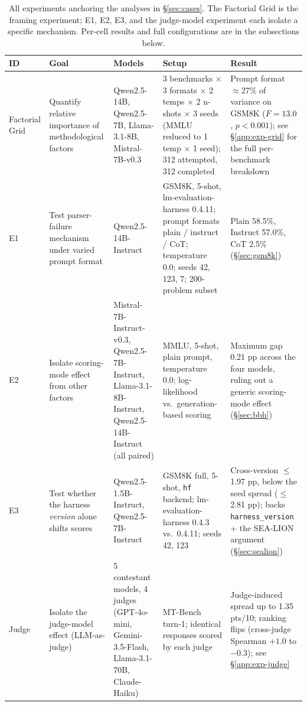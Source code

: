 \documentclass[11pt]{article}
\begin{document}
\begin{table}[ht]
\centering
\footnotesize
\setlength{\tabcolsep}{3pt}
\begin{tabular}{lp{3.2cm}p{2.6cm}p{4.0cm}p{3.4cm}}
\toprule
\textbf{ID} & \textbf{Goal} & \textbf{Models} & \textbf{Setup} & \textbf{Result} \\
\midrule
Factorial Grid &
Quantify relative importance of methodological factors &
Qwen2.5-14B, Qwen2.5-7B, Llama-3.1-8B, Mistral-7B-v0.3 &
3 benchmarks $\times$ 3 formats $\times$ 2 temps $\times$ 2 n-shots $\times$ 3 seeds (MMLU reduced to 1 temp $\times$ 1 seed); 312 attempted, 312 completed &
Prompt format $\approx$27\% of variance on GSM8K ($F{=}13.0$, $p{<}0.001$); see \S\ref{app:exp-grid} for the full per-benchmark breakdown \\
\midrule
E1 &
Test parser-failure mechanism under varied prompt format &
Qwen2.5-14B-Instruct &
GSM8K, 5-shot, lm-evaluation-harness 0.4.11; prompt formats plain / instruct / CoT; temperature 0.0; seeds 42, 123, 7; 200-problem subset &
Plain 58.5\%, Instruct 57.0\%, CoT 2.5\% (\S\ref{sec:gsm8k}) \\
\midrule
E2 &
Isolate scoring-mode effect from other factors &
Mistral-7B-Instruct-v0.3, Qwen2.5-7B-Instruct, Llama-3.1-8B-Instruct, Qwen2.5-14B-Instruct (all paired) &
MMLU, 5-shot, plain prompt, temperature 0.0; log-likelihood vs.\ generation-based scoring &
Maximum gap 0.21 pp across the four models, ruling out a generic scoring-mode effect (\S\ref{sec:bbh}) \\
\midrule
E3 &
Test whether the harness \emph{version} alone shifts scores &
Qwen2.5-1.5B-Instruct, Qwen2.5-7B-Instruct &
GSM8K full, 5-shot, \texttt{hf} backend; lm-evaluation-harness 0.4.3 vs.\ 0.4.11; seeds 42, 123 &
Cross-version $\le$1.97 pp, below the seed spread ($\le$2.81 pp); backs \texttt{harness\_version} + the SEA-LION argument (\S\ref{sec:sealion}) \\
\midrule
Judge &
Isolate the judge-model effect (LLM-as-judge) &
5 contestant models, 4 judges (GPT-4o-mini, Gemini-3.5-Flash, Llama-3.1-70B, Claude-Haiku) &
MT-Bench turn-1; identical responses scored by each judge &
Judge-induced spread up to 1.35 pts/10; ranking flips (cross-judge Spearman $+1.0$ to $-0.3$); see \S\ref{app:exp-judge} \\
\bottomrule
\end{tabular}
\caption{All experiments anchoring the analyses in \S\ref{sec:cases}. The
Factorial Grid is the framing experiment; E1, E2, E3, and the judge-model
experiment each isolate a specific mechanism. Per-cell results and full
configurations are in the subsections below.}
\label{tab:experiments-master}
\end{table}
\end{document}
